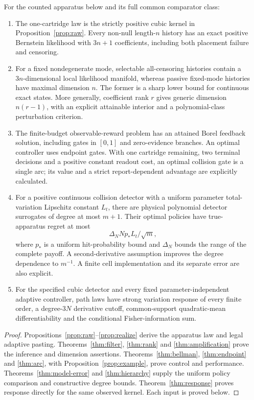 \begin{theorem}\label{thm:main}
For the counted apparatus below and its full common comparator class:
\begin{enumerate}
\item The one-cartridge law is the strictly positive cubic kernel in Proposition~\ref{prop:raw}. Every non-null length-$n$ history has an exact positive Bernstein likelihood with $3n+1$ coefficients, including both placement failure and censoring.
\item For a fixed nondegenerate mode, selectable all-censoring histories contain a $3n$-dimensional local likelihood manifold, whereas passive fixed-mode histories have maximal dimension $n$. The former is a sharp lower bound for continuous exact states. More generally, coefficient rank $r$ gives generic dimension $n(r-1)$, with an explicit attainable interior and a polynomial-class perturbation criterion.
\item The finite-budget observable-reward problem has an attained Borel feedback solution, including gates in $[0,1]$ and zero-evidence branches. An optimal controller uses endpoint gates. With one cartridge remaining, two terminal decisions and a positive constant readout cost, an optimal collision gate is a single arc; its value and a strict report-dependent advantage are explicitly calculated.
\item For a positive continuous collision detector with a uniform parameter total-variation Lipschitz constant $L_t$, there are physical polynomial detector surrogates of degree at most $m+1$. Their optimal policies have true-apparatus regret at most
\[
 \Delta_N N p_* L_t/\sqrt m,
\]
where $p_*$ is a uniform hit-probability bound and $\Delta_N$ bounds the range of the complete payoff. A second-derivative assumption improves the degree dependence to $m^{-1}$. A finite cell implementation and its separate error are also explicit.
\item For the specified cubic detector and every fixed parameter-independent adaptive controller, path laws have strong variation response of every finite order, a degree-$3N$ derivative cutoff, common-support quadratic-mean differentiability and the conditional Fisher-information sum.
\end{enumerate}
\end{theorem}
\begin{proof}
Propositions~\ref{prop:raw}--\ref{prop:realize} derive the apparatus law and legal adaptive pasting. Theorems~\ref{thm:filter}, \ref{thm:rank} and \ref{thm:amplification} prove the inference and dimension assertions. Theorems~\ref{thm:bellman}, \ref{thm:endpoint} and \ref{thm:arc}, with Proposition~\ref{prop:example}, prove control and performance. Theorems~\ref{thm:model-error} and \ref{thm:hierarchy} supply the uniform policy comparison and constructive degree bounds. Theorem~\ref{thm:response} proves response directly for the same observed kernel. Each input is proved below.
\end{proof}

